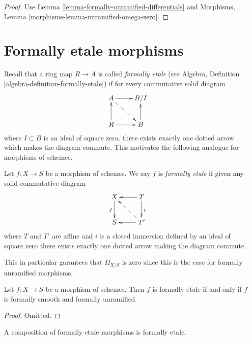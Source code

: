 \begin{proof}
Use Lemma \ref{lemma-formally-unramified-differentials} and
Morphisms, Lemma \ref{morphisms-lemma-unramified-omega-zero}.
\end{proof}













\section{Formally etale morphisms}
\label{section-formally-etale}

\noindent
Recall that a ring map $R \to A$ is called {\it formally etale}
(see Algebra, Definition \ref{algebra-definition-formally-etale})
if for every commutative solid diagram
$$
\xymatrix{
A \ar[r] \ar@{-->}[rd] & B/I \\
R \ar[r] \ar[u] & B \ar[u]
}
$$
where $I \subset B$ is an ideal of square zero, there exists
exactly one dotted arrow which makes the diagram commute. This motivates
the following analogue for morphisms of schemes.

\begin{definition}
\label{definition-formally-etale}
Let $f : X \to S$ be a morphism of schemes.
We say $f$ is {\it formally etale} if given any solid commutative diagram
$$
\xymatrix{
X \ar[d]_f & T \ar[d]^i \ar[l] \\
S & T' \ar[l] \ar@{-->}[lu]
}
$$
where $T$ and $T'$ are affine and $i$ is a closed immersion defined
by an ideal of square zero there exists exactly one
dotted arrow making the diagram commute.
\end{definition}

\noindent
This in particular garantees that $\Omega_{X/S}$ is zero since
this is the case for formally unramified morphisms.

\begin{lemma}
\label{lemma-formally-etale-unramfied-smooth}
Let $f : X \to S$ be a morphism of schemes.
Then $f$ is formally etale if and only if
$f$ is formally smooth and formally unramified.
\end{lemma}

\begin{proof}
Omitted.
\end{proof}

\begin{lemma}
\label{lemma-composition-formally-etale}
A composition of formally etale morphisms is formally etale.
\end{lemma}

